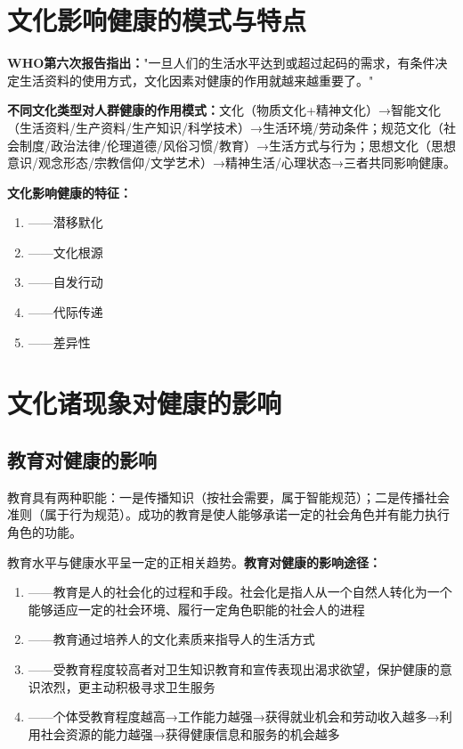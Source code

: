\section{文化影响健康的模式与特点}

\begin{keybox}
\textbf{WHO第六次报告指出：}"一旦人们的生活水平达到或超过起码的需求，有条件决定生活资料的使用方式，文化因素对健康的作用就越来越重要了。"

\textbf{不同文化类型对人群健康的作用模式：}文化（物质文化+精神文化）→智能文化（生活资料/生产资料/生产知识/科学技术）→生活环境/劳动条件；规范文化（社会制度/政治法律/伦理道德/风俗习惯/教育）→生活方式与行为；思想文化（思想意识/观念形态/宗教信仰/文学艺术）→精神生活/心理状态→三者共同影响健康。

\textbf{文化影响健康的特征：}
\begin{enumerate}[leftmargin=*]
    \item {}——潜移默化
    \item {}——文化根源
    \item {}——自发行动
    \item {}——代际传递
    \item {}——差异性
\end{enumerate}
\end{keybox}

\section{文化诸现象对健康的影响}

\subsection{教育对健康的影响}

\begin{keybox}
教育具有两种职能：一是传播知识（按社会需要，属于智能规范）；二是传播社会准则（属于行为规范）。成功的教育是使人能够承诺一定的社会角色并有能力执行角色的功能。

教育水平与健康水平呈一定的正相关趋势。\textbf{教育对健康的影响途径：}
\begin{enumerate}[leftmargin=*]
    \item {}——教育是人的社会化的过程和手段。社会化是指人从一个自然人转化为一个能够适应一定的社会环境、履行一定角色职能的社会人的进程
    \item {}——教育通过培养人的文化素质来指导人的生活方式
    \item {}——受教育程度较高者对卫生知识教育和宣传表现出渴求欲望，保护健康的意识浓烈，更主动积极寻求卫生服务
    \item {}——个体受教育程度越高→工作能力越强→获得就业机会和劳动收入越多→利用社会资源的能力越强→获得健康信息和服务的机会越多
\end{enumerate}
\end{keybox}

